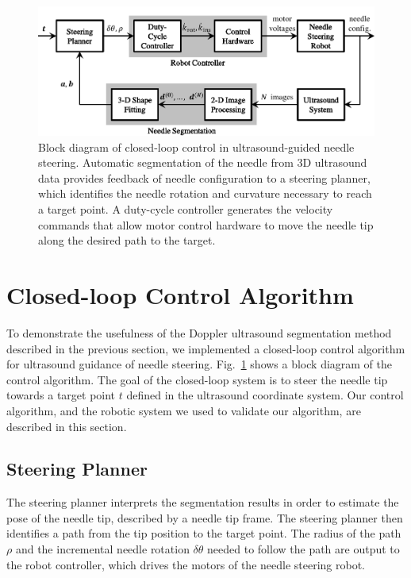\begin{figure}[!t]
\centering
\includegraphics[width=0.85\columnwidth]{Images/Chapter2/ControlBlockDiagram/ControlBlockDiagram}%
\caption[Block diagram of closed-loop control algorithm]{Block diagram of closed-loop control in ultrasound-guided needle steering. Automatic segmentation of the needle from 3D ultrasound data provides feedback of needle configuration to a steering planner, which identifies the needle rotation and curvature necessary to reach a target point. A duty-cycle controller generates the velocity commands that allow motor control hardware to move the needle tip along the desired path to the target.}
\label{fig:ControlBlockDiagram}
\end{figure}

\section{Closed-loop Control Algorithm}
\label{sec:Closed-loopControlDoppler}
To demonstrate the usefulness of the Doppler ultrasound segmentation method described in the previous section, we implemented a closed-loop control algorithm for ultrasound guidance of needle steering. Fig.~\ref{fig:ControlBlockDiagram} shows a block diagram of the control algorithm. The goal of the closed-loop system is to steer the needle tip towards a target point ${t}$ defined in the ultrasound coordinate system. Our control algorithm, and the robotic system we used to validate our algorithm, are described in this section. 

\subsection{Steering Planner}
The steering planner interprets the segmentation results in order to estimate the pose of the needle tip, described by a needle tip frame. The steering planner then identifies a path from the tip position to the target point. The radius of the path $\rho$ and the incremental needle rotation $\delta\theta$ needed to follow the path are output to the robot controller, which drives the motors of the needle steering robot.


